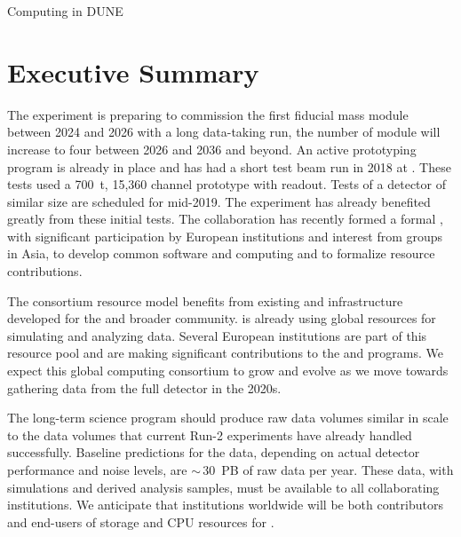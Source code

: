 \newcommand{\ignore}[1]


\chapter{Computing in DUNE}
\label{ch:exec-comp}

\section{Executive Summary}
\label{ch:exec-comp-es}

The  experiment is preparing to commission the first \nominalmodsize fiducial mass  module between 2024 and 2026 with a long data-taking run, the number of module will increase to four between 2026 and 2036 and beyond.  An active prototyping program is already in place and has had  a short test beam run in 2018 at .  These tests used  a \SI{700}{t}, 15,360 channel prototype  with  readout.  Tests of a  detector of similar size are scheduled for mid-2019.   The  experiment has already  benefited greatly from these initial tests.  The collaboration has recently formed a formal , with significant participation by European institutions and interest from groups in Asia, to develop common software and computing and to formalize resource contributions.

The consortium resource model benefits from existing   and  infrastructure developed for the  and broader  community.   %
is already using global resources for simulating and analyzing   data.  Several European institutions are part of this resource pool and are making significant contributions to the  and  programs.  We expect this global computing consortium to grow and evolve as we move towards gathering data from the full  detector in the 2020s.

The long-term  science program should produce raw data volumes similar in scale to the data volumes that current  Run-2 experiments have already handled successfully.  Baseline predictions for the  data, depending on actual detector performance and noise levels, are $\sim\,$\SI{30}{PB} of raw data per year.  These data, with simulations and derived analysis samples, must be available to all collaborating institutions.  We anticipate that institutions worldwide will be both contributors and end-users of storage and CPU resources for .




